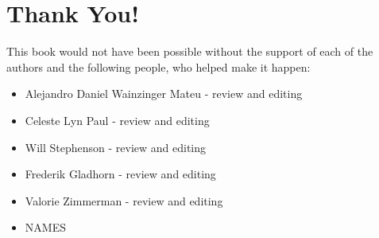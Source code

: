 \section*{Thank You!}

This book would not have been possible without the support of each of the
authors and the following people, who helped make it happen:
\begin{itemize}
 \item Alejandro Daniel Wainzinger Mateu - review and editing
 \item Celeste Lyn Paul - review and editing
 \item Will Stephenson - review and editing
 \item Frederik Gladhorn - review and editing
 \item Valorie Zimmerman - review and editing
 \item NAMES
\end{itemize}

\newpage
